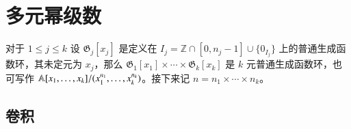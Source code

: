 





\section{多元幂级数}

\begin{definition}
对于 $1\le j\le k$ 设 $\mathfrak G_j[x_j]$ 是定义在 $I_j = \mathbb Z\cap[0,n_j-1] \cup \{0_{I_j}\}$ 上的普通生成函数环，其未定元为 $x_j$，那么 $\mathfrak G_1[x_1]\times \cdots \times \mathfrak G_k[x_k]$ 是 $k$ 元普通生成函数环，也可写作 $\mathbb A[x_1,\dots,x_k]/(x_1^{n_1},\dots,x_k^{n_k})$。接下来记 $n = n_1 \times \cdots \times n_k$。
\end{definition}

\subsection{卷积}

